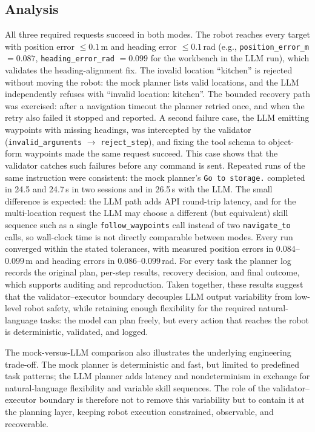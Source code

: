 \documentclass[conference]{IEEEtran}
\begin{document}
\subsection{Analysis}
All three required requests succeed in both modes. The robot reaches every
target with position error $\le 0.1$\,m and heading error $\le 0.1$\,rad
(e.g., \texttt{position\_error\_m} $=0.087$,
\texttt{heading\_error\_rad} $=0.099$ for the workbench in the LLM run), which
validates the heading-alignment fix. The invalid location ``kitchen'' is
rejected without moving the robot: the mock planner lists valid
locations, and the LLM independently refuses with
``invalid location: kitchen''. The bounded recovery path was exercised:
after a navigation timeout the planner retried once, and when the retry also
failed it stopped and reported. A second failure case, the LLM emitting
waypoints with missing headings, was intercepted by the validator
(\texttt{invalid\_arguments} $\rightarrow$ \texttt{reject\_step}), and fixing
the tool schema to object-form waypoints made the same request succeed.
This case shows that the validator catches such failures before any command
is sent. Repeated runs of the same instruction were consistent: the mock
planner's \texttt{Go to storage.} completed in 24.5 and 24.7\,s in two
sessions and in 26.5\,s with the LLM. The small difference is expected: the
LLM path adds API round-trip latency, and for the multi-location request the
LLM may choose a different (but equivalent) skill sequence such as a single
\texttt{follow\_waypoints} call instead of two \texttt{navigate\_to} calls,
so wall-clock time is not directly comparable between modes. Every run
converged within the stated tolerances, with measured position errors in
$0.084$--$0.099$\,m and heading errors in $0.086$--$0.099$\,rad.
For every task the planner log records the original plan, per-step results,
recovery decision, and final outcome, which supports auditing and
reproduction. Taken together, these results suggest that the
validator--executor boundary decouples LLM output variability
from low-level robot safety, while retaining enough flexibility for the
required natural-language tasks: the model can plan freely, but every action
that reaches the robot is deterministic, validated, and logged.

The mock-versus-LLM comparison also illustrates the underlying engineering
trade-off. The mock planner is deterministic and fast, but limited to
predefined task patterns; the LLM planner adds latency and nondeterminism
in exchange for natural-language flexibility and variable skill sequences.
The role of the validator--executor boundary is therefore not to remove
this variability but to contain it at the planning layer, keeping robot
execution constrained, observable, and recoverable.
\end{document}
